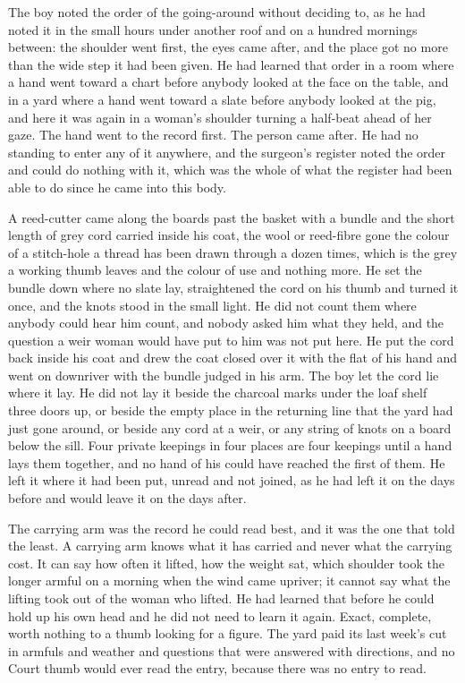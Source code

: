 The boy noted the order of the going-around without deciding to, as he had noted it in the small hours under another roof and on a hundred mornings between: the shoulder went first, the eyes came after, and the place got no more than the wide step it had been given. He had learned that order in a room where a hand went toward a chart before anybody looked at the face on the table, and in a yard where a hand went toward a slate before anybody looked at the pig, and here it was again in a woman's shoulder turning a half-beat ahead of her gaze. The hand went to the record first. The person came after. He had no standing to enter any of it anywhere, and the surgeon's register noted the order and could do nothing with it, which was the whole of what the register had been able to do since he came into this body.

A reed-cutter came along the boards past the basket with a bundle and the short length of grey cord carried inside his coat, the wool or reed-fibre gone the colour of a stitch-hole a thread has been drawn through a dozen times, which is the grey a working thumb leaves and the colour of use and nothing more. He set the bundle down where no slate lay, straightened the cord on his thumb and turned it once, and the knots stood in the small light. He did not count them where anybody could hear him count, and nobody asked him what they held, and the question a weir woman would have put to him was not put here. He put the cord back inside his coat and drew the coat closed over it with the flat of his hand and went on downriver with the bundle judged in his arm. The boy let the cord lie where it lay. He did not lay it beside the charcoal marks under the loaf shelf three doors up, or beside the empty place in the returning line that the yard had just gone around, or beside any cord at a weir, or any string of knots on a board below the sill. Four private keepings in four places are four keepings until a hand lays them together, and no hand of his could have reached the first of them. He left it where it had been put, unread and not joined, as he had left it on the days before and would leave it on the days after.

The carrying arm was the record he could read best, and it was the one that told the least. A carrying arm knows what it has carried and never what the carrying cost. It can say how often it lifted, how the weight sat, which shoulder took the longer armful on a morning when the wind came upriver; it cannot say what the lifting took out of the woman who lifted. He had learned that before he could hold up his own head and he did not need to learn it again. Exact, complete, worth nothing to a thumb looking for a figure. The yard paid its last week's cut in armfuls and weather and questions that were answered with directions, and no Court thumb would ever read the entry, because there was no entry to read.

